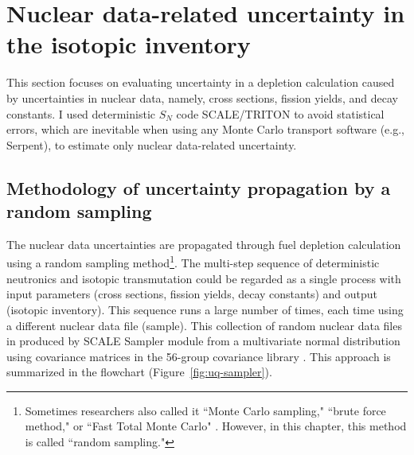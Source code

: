 \section{Nuclear data-related uncertainty in the isotopic inventory}
This section focuses on evaluating uncertainty in a depletion calculation 
caused by uncertainties in nuclear data, namely, cross sections, fission 
yields, and decay constants. I used deterministic $S_N$ code SCALE/TRITON 
\cite{rearden_scale_2018} to avoid statistical errors, which are inevitable 
when using any Monte Carlo transport software (e.g., Serpent), to estimate 
only nuclear data-related uncertainty.

\subsection{Methodology of uncertainty propagation by a random sampling}
The nuclear data uncertainties are propagated through fuel depletion 
calculation using a random sampling method\footnote{Sometimes researchers also 
called it ``Monte Carlo sampling," \cite{radaideh_uncertainty_2018} ``brute 
force method,"\cite{garcia-herranz_propagation_2008} or ``Fast Total Monte 
Carlo" \cite{rochman_nuclear_2014}. However, in this chapter, this method is 
called ``random  sampling."}. The multi-step sequence of deterministic 
neutronics and isotopic transmutation could be regarded as a single 
process with input parameters (cross sections, fission yields, decay 
constants) and output (isotopic inventory). This sequence runs a 
large number of times, each time using
a different nuclear data file (sample). 
This
collection of random nuclear data files in produced by
SCALE Sampler 
module from a multivariate normal distribution using covariance matrices in 
the 56-group covariance library \cite{rearden_scale_2018, 
radaideh_novel_2019-1}. This approach is summarized in the flowchart 
(Figure~\ref{fig:uq-sampler}).

